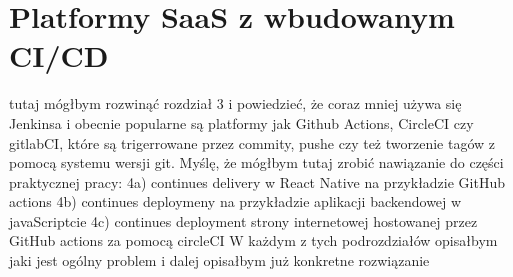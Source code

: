 \section{Platformy SaaS z wbudowanym CI/CD}
tutaj mógłbym rozwinąć rozdział 3 i powiedzieć, że coraz mniej używa się Jenkinsa i obecnie popularne są platformy jak Github Actions, CircleCI czy gitlabCI, które są trigerrowane przez commity, pushe czy też tworzenie tagów z pomocą systemu wersji git. Myślę, że mógłbym tutaj zrobić nawiązanie do części praktycznej pracy:
4a) continues delivery w React Native  na przykładzie GitHub actions
4b) continues deploymeny na przykładzie aplikacji backendowej w javaScriptcie
4c) continues deployment strony internetowej hostowanej przez GitHub actions za pomocą circleCI
W każdym z tych podrozdziałów opisałbym jaki jest ogólny problem i dalej opisałbym już konkretne rozwiązanie